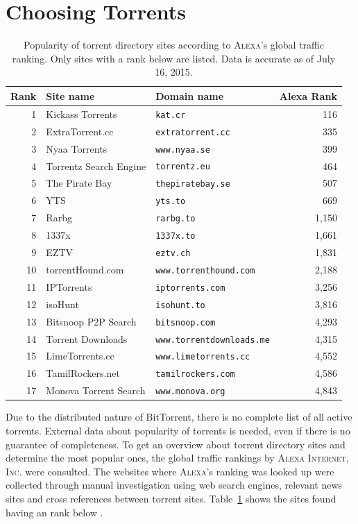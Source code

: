 \documentclass[10pt, a4paper, twoside=false, headsepline]{scrbook}
\renewcommand{\_}{\origunderscore\allowbreak}
\begin{document}
\section{Choosing Torrents}
\label{cho}
\begin{table}
\centering
\begin{tabular}{rllr}
\toprule
Rank & Site name & Domain name & Alexa Rank \\
\midrule
1 & Kickass Torrents & \texttt{kat.cr} & 116 \\
2 & ExtraTorrent.cc & \texttt{extratorrent.cc} & 335 \\
3 & Nyaa Torrents & \texttt{www.nyaa.se} & 399 \\
4 & Torrentz Search Engine & \texttt{torrentz.eu} & 464 \\
5 & The Pirate Bay & \texttt{thepiratebay.se} & 507 \\
6 & YTS & \texttt{yts.to} & 669 \\
7 & Rarbg & \texttt{rarbg.to} & 1,150 \\
8 & 1337x & \texttt{1337x.to} & 1,661 \\
9 & EZTV & \texttt{eztv.ch} & 1,831 \\
10 & torrentHound.com & \texttt{www.torrenthound.com} & 2,188 \\
11 & IPTorrents & \texttt{iptorrents.com} & 3,256 \\
12 & isoHunt & \texttt{isohunt.to} & 3,816 \\
13 & Bitsnoop P2P Search & \texttt{bitsnoop.com} & 4,293 \\
14 & Torrent Downloads & \texttt{www.torrentdownloads.me} & 4,315 \\
15 & LimeTorrents.cc & \texttt{www.limetorrents.cc} & 4,552 \\
16 & TamilRockers.net & \texttt{tamilrockers.com} & 4,586 \\
17 & Monova Torrent Search & \texttt{www.monova.org} & 4,843 \\
\bottomrule
\end{tabular}
\caption[Popular torrent directory sites according to \textsc{Alexa}]{Popularity of torrent directory sites according to \textsc{Alexa}'s \cite{alexa} global traffic ranking. Only sites with a rank below  are listed. Data is accurate as of July 16, 2015.}
\label{torrentsites}
\end{table}

Due to the distributed nature of BitTorrent, there is no complete list of all active torrents. External data about popularity of torrents is needed, even if there is no guarantee of completeness. To get an overview about torrent directory sites and determine the most popular ones, the global traffic rankings by \textsc{Alexa Internet, Inc.} \cite{alexa} were consulted. The websites where \textsc{Alexa}'s ranking was looked up were collected through manual investigation using web search engines, relevant news sites and cross references between torrent sites. Table~\ref{torrentsites} shows the  sites found having an rank below .
\end{document}
